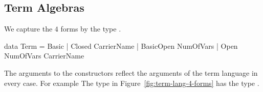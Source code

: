\subsection{Term Algebras}
\begin{comment}
We differentiate between $4$ different forms of term languages that differ in their expressive power, as shown in Figure~\ref{fig:term-lang-4-forms}. 
\begin{figure}
    
    \caption{The term language of \lstmath{Monoid} expressed in $4$ different ways.}
    \label{fig:term-lang-4-forms}
\end{figure}

The \lstmath{Basic} term language defines expressions created using the function symbols of the theory. At this level of abstraction, referring to elements of the carrier is not possible.
Considering, for example, the binary operation of the basic \lstmath{Monoid} term language in Figure~\ref{fig:term-lang-4-forms}, \lstmath{opL}. Its arguments are either the constant \lstmath{eL} or another call for \lstmath{opL}. 
\lstmath{Closed} term languages solve this problem by providing the \lstmath{sing} constructor, abbreviation for \emph{singleton}, that lifts element of type \lstmath{A} into instances of the closed term language. Assuming that the carrier is the type of natural numbers \lstmath{Nat}, a possible term in the language would be \lstmath{opCl (sing (suc zero)) eCl}. 

\lstmath{Open} term languages provides extra constructor to represent variables, represented using the \lstmath{Fin} type. The two open term languages are shown on the right hand side of Figure~\ref{fig:term-lang-4-forms}.  
\end{comment} 
We capture the $4$ forms by the type . 
\begin{hscode}
data Term = Basic
          | Closed CarrierName
          | BasicOpen NumOfVars
          | Open NumOfVars CarrierName
\end{hscode}
\noindent The arguments to the constructors reflect the arguments of the term language in every case. For example The type  in Figure~\ref{fig:term-lang-4-forms} has the type . 

